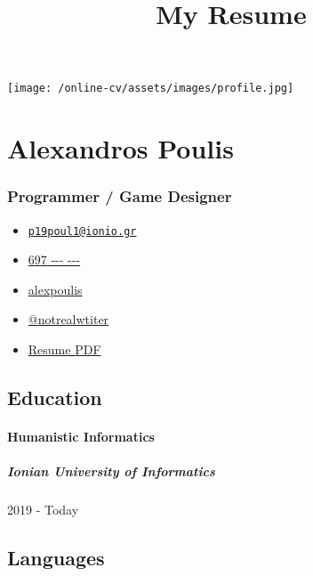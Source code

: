 \documentclass[english,]{article}
\title{My Resume}
\date{}
\providecommand{\tightlist}{%
  \setlength{\itemsep}{0pt}\setlength{\parskip}{0pt}}
\let\oldparagraph\paragraph
\renewcommand{\paragraph}[1]{\oldparagraph{#1}\mbox{}}
\let\oldsubparagraph\subparagraph
\renewcommand{\subparagraph}[1]{\oldsubparagraph{#1}\mbox{}}
\begin{document}
\maketitle

\texttt{[image: /online-cv/assets/images/profile.jpg]}

\hypertarget{alexandros-poulis}{%
\section{Alexandros Poulis}\label{alexandros-poulis}}

\hypertarget{programmer-game-designer}{%
\subsubsection{Programmer / Game
Designer}\label{programmer-game-designer}}

\begin{itemize}
\tightlist
\item
  \emph{} \href{mailto:p19poul1@ionio.gr}{\nolinkurl{p19poul1@ionio.gr}}
\item
  \emph{} \href{tel:697\%20---\%20---}{697 -\/-\/- -\/-\/-}
\item
  \emph{} \href{http://github.com/alexpoulis}{alexpoulis}
\item
  \emph{} \href{https://twitter.com/@notrealwtiter}{@notrealwtiter}
\item
  \emph{} \href{http://www.africau.edu/images/default/sample.pdf}{Resume
  PDF}
\end{itemize}

\hypertarget{education}{%
\subsection{Education}\label{education}}

\hypertarget{humanistic-informatics}{%
\paragraph{Humanistic Informatics}\label{humanistic-informatics}}

\hypertarget{ionian-university-of-informatics}{%
\subparagraph{Ionian University of
Informatics}\label{ionian-university-of-informatics}}

2019 - Today

\hypertarget{languages}{%
\subsection{Languages}\label{languages}}
\end{document}
